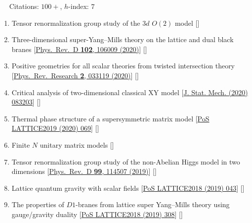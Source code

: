 ~~ Citations: $100+$, $h$-index: $7$
\begin{enumerate}
 \item Tensor renormalization group study of the $3d$ $O(2)$ model [\texttt{\textbf{}}] 
 \item Three-dimensional super-Yang--Mills theory on the lattice and dual black branes [\href{https://journals.aps.org/prd/abstract/10.1103/PhysRevD.102.106009}{Phys.\ Rev.\ D {\bf 102}, 106009 (2020)}] [\textbf{\texttt{}}] 
 \item Positive geometries for all scalar theories from twisted intersection theory [\href{https://journals.aps.org/prresearch/abstract/10.1103/PhysRevResearch.2.033119}{Phys.\ Rev.\ Research {\bf 2}, 033119 (2020)}] [\texttt{\textbf{}}] 
  \item Critical analysis of two-dimensional classical XY model [\href{https://iopscience.iop.org/article/10.1088/1742-5468/aba686/pdf}{J. Stat. Mech. (2020) 083203}] [\texttt{\textbf{}}] 
 \item Thermal phase structure of a supersymmetric matrix model [\href{https://pos.sissa.it/363/069}{PoS LATTICE2019 (2020) 069}] [\texttt{\textbf{}}] %
 \item  Finite $N$ unitary matrix models [\textbf{\texttt{}}] 
  \item Tensor renormalization group study of the non-Abelian Higgs model in two dimensions [\href{https://journals.aps.org/prd/abstract/10.1103/PhysRevD.99.114507}{Phys.\ Rev.\ D {\bf 99}, 114507 (2019)}] [\texttt{\textbf{}}] 
 \item  Lattice quantum gravity with scalar fields [\href{https://pos.sissa.it/334/043}{PoS LATTICE2018 (2019) 043}] [\texttt{\textbf{}}] %
  \item  The properties of $D1$-branes from lattice super Yang--Mills theory using gauge/gravity duality [\href{https://pos.sissa.it/334/308}{PoS LATTICE2018 (2019) 308}]   [\texttt{\textbf{}}] %

\end{enumerate}
